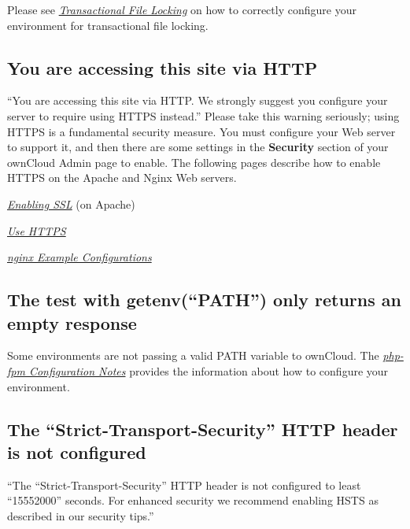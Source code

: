 \documentclass[letterpaper,10pt,english]{sphinxmanual}
\begin{document}
Please see {\hyperref[configuration_files/files_locking_transactional::doc]{\emph{\emph{Transactional File Locking}}}} on how
to correctly configure your environment for transactional file locking.


\subsection{You are accessing this site via HTTP}
\label{configuration_server/security_setup_warnings:you-are-accessing-this-site-via-http}
``You are accessing this site via HTTP. We strongly suggest you configure your
server to require using HTTPS instead.'' Please take this warning seriously;
using HTTPS is a fundamental security measure. You must configure your Web
server to support it, and then there are some settings in the \textbf{Security}
section of your ownCloud Admin page to enable. The following pages
describe how to enable HTTPS on the Apache and Nginx Web servers.

{\hyperref[installation/source_installation:enabling\string-ssl\string-label]{\emph{Enabling SSL}}} (on Apache)

{\hyperref[configuration_server/harden_server:use\string-https\string-label]{\emph{Use HTTPS}}}

{\hyperref[installation/nginx_examples::doc]{\emph{\emph{nginx Example Configurations}}}}


\subsection{The test with getenv(``PATH'') only returns an empty response}
\label{configuration_server/security_setup_warnings:the-test-with-getenv-path-only-returns-an-empty-response}
Some environments are not passing a valid PATH variable to ownCloud. The
{\hyperref[installation/source_installation:php\string-fpm\string-tips\string-label]{\emph{php-fpm Configuration Notes}}} provides the information about how to configure your
environment.


\subsection{The ``Strict-Transport-Security'' HTTP header is not configured}
\label{configuration_server/security_setup_warnings:the-strict-transport-security-http-header-is-not-configured}
``The ``Strict-Transport-Security'' HTTP header is not configured to least ``15552000'' seconds.
For enhanced security we recommend enabling HSTS as described in our security tips.''
\end{document}
